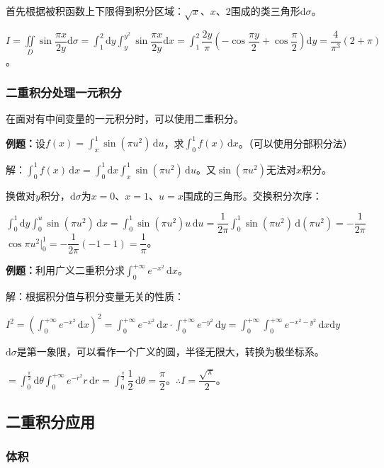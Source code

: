 \documentclass[UTF8, 12pt]{ctexart}
\begin{document}
首先根据被积函数上下限得到积分区域：$\sqrt{x}$、$x$、2围成的类三角形$\textrm{d}\sigma$。

$I=\displaystyle{\iint\limits_D\sin\dfrac{\pi x}{2y}\textrm{d}\sigma}=\displaystyle{\int_1^2\textrm{d}y\int_y^{y^2}\sin\dfrac{\pi x}{2y}\textrm{d}x}=\displaystyle{\int_1^2\dfrac{2y}{\pi}\left(-\cos\dfrac{\pi y}{2}+\cos\dfrac{\pi}{2}\right)}\textrm{d}y=\dfrac{4}{\pi^3}(2+\pi)$。

\subsubsection{二重积分处理一元积分}

在面对有中间变量的一元积分时，可以使用二重积分。

\textbf{例题：}设$f(x)=\int_x^1\sin(\pi u^2)\,\textrm{d}u$，求$\int_0^1f(x)\,\textrm{d}x$。（可以使用分部积分法）

解：$\int_0^1f(x)\,\textrm{d}x=\int_0^1\textrm{d}x\int_x^1\sin(\pi u^2)\,\textrm{d}u$。又$\sin(\pi u^2)$无法对$x$积分。

换做对$y$积分，$\textrm{d}\sigma$为$x=0$、$x=1$、$u=x$围成的三角形。交换积分次序：

$\int_0^1\textrm{d}y\int_0^u\sin(\pi u^2)\,\textrm{d}x=\int_0^1\sin(\pi u^2)u\,\textrm{d}u=\dfrac{1}{2\pi}\int_0^1\sin(\pi u^2)\,\textrm{d}(\pi u^2)=-\dfrac{1}{2\pi}$\\$\cos\pi u^2|_0^1=-\dfrac{1}{2\pi}(-1-1)=\dfrac{1}{\pi}$。

\textbf{例题：}利用广义二重积分求$\int_0^{+\infty}e^{-x^2}\,\textrm{d}x$。

解：根据积分值与积分变量无关的性质：

$I^2=(\int_0^{+\infty}e^{-x^2}\,\textrm{d}x)^2=\int_0^{+\infty}e^{-x^2}\,\textrm{d}x\cdot\int_0^{+\infty}e^{-y^2}\,\textrm{d}y=\int_0^{+\infty}\int_0^{+\infty}e^{-x^2-y^2}\,\textrm{d}x\textrm{d}y$

$\textrm{d}\sigma$是第一象限，可以看作一个广义的圆，半径无限大，转换为极坐标系。

$=\int_0^\frac{\pi}{2}\textrm{d}\theta\int_0^{+\infty}e^{-r^2}r\,\textrm{d}r=\displaystyle{\int_0^\frac{\pi}{2}\dfrac{1}{2}\,\textrm{d}\theta}=\dfrac{\pi}{2}$。$\therefore I=\dfrac{\sqrt{\pi}}{2}$。

\subsection{二重积分应用}

\subsubsection{体积}
\end{document}
